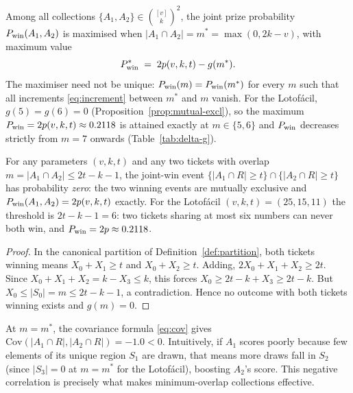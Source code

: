 \begin{corollary}[Minimum overlap is optimal for $n=2$]
  \label{cor:min-overlap-optimal}
  Among all collections $\{A_1, A_2\} \in \binom{[v]}{k}^2$, the joint
  prize probability $P_{\mathrm{win}}(A_1, A_2)$ is maximised when
  $|A_1 \cap A_2| = m^* = \max(0, 2k-v)$, with maximum value
  \[
    P_{\mathrm{win}}^* \;=\; 2p(v,k,t) - g(m^*).
  \]
  The maximiser need not be unique: $P_{\mathrm{win}}(m) = P_{\mathrm{win}}(m^*)$ for every $m$
  such that all increments \eqref{eq:increment} between $m^*$ and $m$
  vanish.  For the Lotofácil, $g(5) = g(6) = 0$
  (Proposition~\ref{prop:mutual-excl}), so the maximum
  $P_{\mathrm{win}} = 2p(v,k,t) \approx 0.2118$ is attained exactly at $m \in \{5, 6\}$
  and $P_{\mathrm{win}}$ decreases strictly from $m = 7$ onwards
  (Table~\ref{tab:delta-g}).
\end{corollary}

\begin{proposition}
  \label{prop:mutual-excl}
  For any parameters $(v,k,t)$ and any two tickets with overlap
  $m = |A_1 \cap A_2| \le 2t - k - 1$, the joint-win event
  $\{|A_1 \cap R| \ge t\} \cap \{|A_2 \cap R| \ge t\}$ has probability
  \emph{zero}: the two winning events are mutually exclusive and
  $P_{\mathrm{win}}(A_1, A_2) = 2p(v,k,t)$ exactly.  For the Lotofácil
  $(v,k,t)=(25,15,11)$ the threshold is $2t-k-1 = 6$: two tickets sharing
  at most six numbers can never both win, and $P_{\mathrm{win}} = 2p \approx 0.2118$.
\end{proposition}

\begin{proof}
  In the canonical partition of Definition~\ref{def:partition}, both
  tickets winning means $X_0 + X_1 \ge t$ and $X_0 + X_2 \ge t$.  Adding,
  $2X_0 + X_1 + X_2 \ge 2t$.  Since $X_0 + X_1 + X_2 = k - X_3 \le k$,
  this forces $X_0 \ge 2t - k + X_3 \ge 2t - k$.  But
  $X_0 \le |S_0| = m \le 2t-k-1$, a contradiction.  Hence no outcome with
  both tickets winning exists and $g(m) = 0$.
\end{proof}

\begin{remark}
  At $m = m^*$, the covariance formula \eqref{eq:cov} gives
  $\mathrm{Cov}(|A_1 \cap R|, |A_2 \cap R|) = -1.0 < 0$.
  Intuitively, if $A_1$ scores
  poorly because few elements of its unique region $S_1$ are drawn, that
  means more draws fall in $S_2$ (since $|S_3|=0$ at $m=m^*$ for the
  Lotofácil), boosting $A_2$'s score.  This negative correlation is
  precisely what makes minimum-overlap collections effective.
\end{remark}

